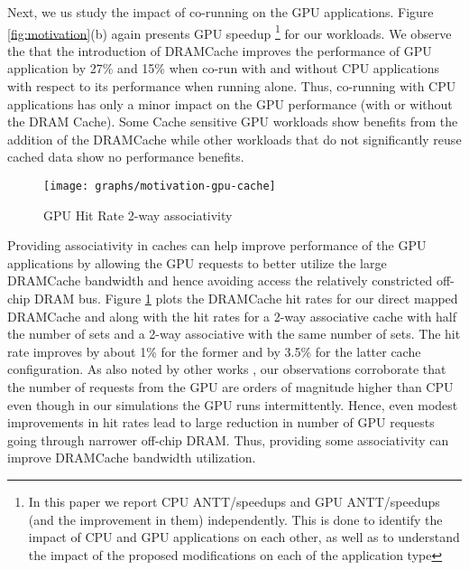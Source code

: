 \par Next, we us study the impact of co-running on the GPU applications.  Figure \ref{fig:motivation}(b) again presents GPU speedup \footnote{In this 
paper we report CPU ANTT/speedups and GPU ANTT/speedups (and the improvement in them) independently. This is done to identify the impact of CPU 
and GPU applications on each other, as well as to understand the impact of the proposed modifications on each of the application
type} 
for our workloads. 
We observe the that the introduction of DRAMCache improves the performance of GPU application by 27\% and 15\% when co-run with and without CPU applications with respect to its performance when running alone.
Thus,  co-running with CPU applications has only a minor impact on the GPU performance (with or without the DRAM Cache). 
Some Cache sensitive GPU workloads show benefits from the addition of the DRAMCache while other workloads that do not significantly reuse cached data show no performance benefits.
\begin{figure}[htbp]
   \texttt{[image: graphs/motivation-gpu-cache]}
   \caption{GPU Hit Rate 2-way associativity}
   \label{fig:motivation-gpu-cache}
\end{figure}
Providing associativity in caches can help improve performance of the GPU applications by allowing the GPU requests to better utilize the large  DRAMCache bandwidth and hence avoiding access the relatively constricted off-chip DRAM bus. Figure \ref{fig:motivation-gpu-cache} plots the DRAMCache hit rates for our direct mapped DRAMCache and along with the hit rates for a 2-way associative cache with half the number of sets and a 2-way associative with the same number of sets. The hit rate improves by about 1\% for the former and by 3.5\% for the latter cache configuration. As also noted by other works \cite{oscar}, our observations corroborate that the number of requests from the GPU are orders of magnitude higher than CPU even though in our simulations the GPU runs intermittently. Hence, even modest improvements in hit rates lead to large reduction in number of GPU requests going through narrower off-chip DRAM. Thus, providing some associativity can improve DRAMCache bandwidth utilization.



